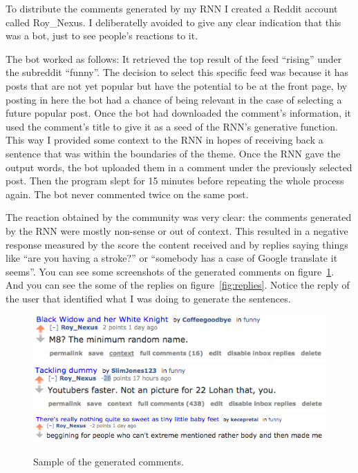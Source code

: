 \documentclass{article} %
\begin{document}

To distribute the comments generated by my RNN I created a Reddit account called
Roy\_Nexus. I deliberatelly avoided to give any clear indication that this was
a bot, just to see people's reactions to it.

The bot worked as follows: It retrieved the top result of the feed ``rising''
under the subreddit ``funny''.  The decision to select this specific feed was
because it has posts that are not yet popular but have the potential to be at
the front page, by posting in here the bot had a chance of being relevant in the
case of selecting a future popular post. Once the bot had downloaded the
comment's information, it used the comment's title to give it as a seed of the
RNN's generative function. This way I provided some context to the RNN in hopes
of receiving back a sentence that was within the boundaries of the theme. Once
the RNN gave the output words, the bot uploaded them in a comment under the
previously selected post. Then the program slept for 15 minutes before repeating
the whole process again. The bot never commented twice on the same post.

The reaction obtained by the community was very clear: the comments generated by
the RNN were mostly non-sense or out of context. This resulted in a negative
response measured by the score the content received and by replies saying things
like ``are you having a stroke?'' or ``somebody has a case of Google translate
it seems''. You can see some screenshots of the generated comments on
figure~\ref{fig:comments}.
And you can see the some of the replies on figure~\ref{fig:replies}. Notice the
reply of the user that identified what I was doing to generate the sentences.

\begin{figure}[h]
\centering
\includegraphics[scale=0.5]{comment2}
\includegraphics[scale=0.5]{comment3}
\includegraphics[scale=0.5]{comment1}
\caption{Sample of the generated comments.}
\label{fig:comments}
\end{figure}
\end{document}
